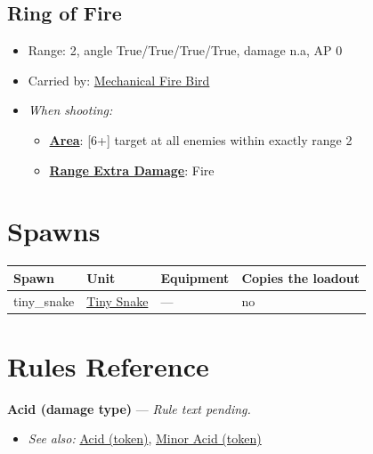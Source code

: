 \documentclass[a4paper,12pt]{article}
\begin{document}
\subsection{Ring of Fire}
\label{equipment-ring-of-fire}

\begin{itemize}
\item Range: 2, angle True/True/True/True, damage n.a, AP 0
\item Carried by: \hyperref[model-mechanical-fire-bird]{Mechanical Fire Bird}
\item \textit{When shooting:}
\begin{itemize}
\item \textbf{\hyperref[rule-special-area]{Area}}: [6+] target at all enemies within exactly range 2
\item \textbf{\hyperref[rule-special-range-extra-damage]{Range Extra Damage}}: Fire

\end{itemize}






\end{itemize}


\newpage
\section{Spawns}
\label{section-spawns}

\begin{longtable}{@{}p{}p{}p{}p{}@{}}
\textbf{Spawn} & \textbf{Unit} & \textbf{Equipment} & \textbf{Copies the loadout} \\
\hline
\endhead
{}\label{spawn-tiny-snake}tiny\_snake & \hyperref[unit-tiny-snake]{Tiny Snake} & --- & no \\
\end{longtable}

\newpage
{}\label{section-rules}
\section{Rules Reference}


\label{rule-damage-type-acid}%
\noindent\textbf{Acid (damage type)} --- \textit{Rule text pending.}\begin{itemize}
\item \textit{See also:} \hyperref[rule-token-acid]{Acid (token)}, \hyperref[rule-token-minor-acid]{Minor Acid (token)}
\end{itemize}
\end{document}
